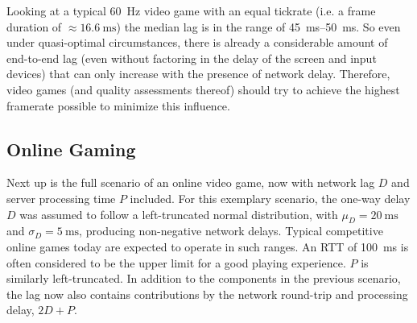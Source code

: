 Looking at a typical \SI{60}{\hertz} video game with an equal tickrate (i.e. a frame duration of $\approx \SI{16.6}{\milli\second}$) the median lag is in the range of \SIrange{45}{50}{\milli\second}. So even under quasi-optimal circumstances, there is already a considerable amount of end-to-end lag (even without factoring in the delay of the screen and input devices) that can only increase with the presence of network delay. Therefore, video games (and quality assessments thereof) should try to achieve the highest framerate possible to minimize this influence.

\subsection{Online Gaming}

Next up is the full scenario of an online video game, now with 
network lag $D$ and server processing time $P$ included. For 
this exemplary scenario, the one-way delay $D$ was assumed to 
follow a left-truncated normal distribution, 
with $\mu_D = \SI{20}{\milli\second}$ and $\sigma_D = \SI{5}{\milli\second}$, 
producing non-negative network delays. Typical competitive online 
games today are expected to operate in such ranges. An 
\acrshort{RTT} of \SI{100}{\milli\second} is often considered to 
be the upper limit for a good playing experience.
$P$ is similarly left-truncated. In addition to the components in 
the previous scenario, the lag now also contains contributions by 
the network round-trip and processing delay, $2D + P$.

